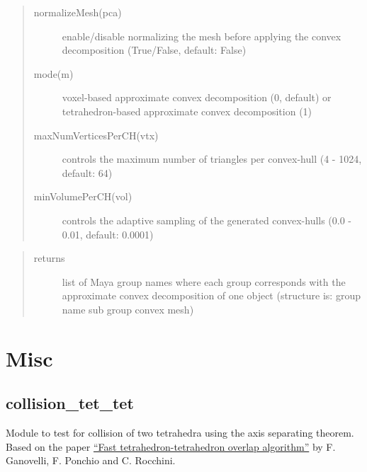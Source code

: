 \documentclass[letterpaper,10pt,english]{sphinxmanual}
\begin{document}
\begin{description}
\begin{quote}
\begin{description}
\item[{normalizeMesh(pca)}] \leavevmode
enable/disable normalizing the mesh before applying the convex decomposition (True/False, default: False)

\item[{mode(m)}] \leavevmode
voxel-based approximate convex decomposition (0, default) or tetrahedron-based approximate convex decomposition (1)

\item[{maxNumVerticesPerCH(vtx)}] \leavevmode
controls the maximum number of triangles per convex-hull (4 - 1024, default: 64)

\item[{minVolumePerCH(vol)}] \leavevmode
controls the adaptive sampling of the generated convex-hulls (0.0 - 0.01, default: 0.0001)

\end{description}\end{quote}

\end{description}
\begin{quote}\begin{description}
\item[{returns}] \leavevmode
list of Maya group names where each group corresponds with the approximate convex decomposition of one object (structure is: group name \textbar{} sub group \textbar{} convex mesh)

\end{description}\end{quote}


\chapter{Misc}
\label{index:sec-misc}\label{index:misc}

\section{collision\_tet\_tet}
\label{pk_src.collision_tet_tet:collision-tet-tet}\label{pk_src.collision_tet_tet::doc}\label{pk_src.collision_tet_tet:id1}
{\hyperref[index:sec\string-misc]{}}
\label{pk_src.collision_tet_tet:module-pk_src.collision_tet_tet}
Module to test for collision of two tetrahedra using the axis separating theorem.
Based on the paper \href{http://vcg.isti.cnr.it/Publications/2003/GPR03/fast\_tetrahedron\_tetrahedron\_overlap\_algorithm.pdf}{``Fast tetrahedron-tetrahedron overlap algorithm''} by F. Ganovelli, F. Ponchio and C. Rocchini.
\end{document}

